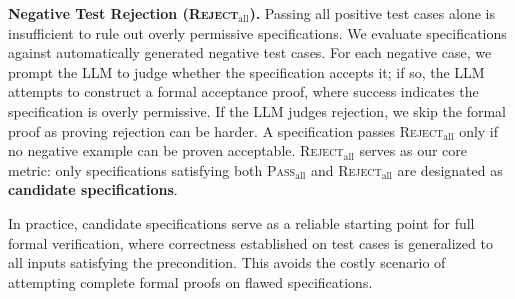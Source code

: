 
\textbf{Negative Test Rejection (\textsc{Reject}$_{\text{all}}$).}
Passing all positive test cases alone is insufficient to rule out overly permissive specifications. 
We evaluate specifications against automatically generated negative test cases. 
For each negative case, we prompt the LLM to judge whether the specification accepts it; if so, the LLM attempts to construct a formal acceptance proof, where success indicates the specification is overly permissive.
If the LLM judges rejection, we skip the formal proof as proving rejection can be harder.
A specification passes \textsc{Reject}$_{\text{all}}$ only if no negative example can be proven acceptable.
\textsc{Reject}$_{\text{all}}$ serves as our core metric: only specifications satisfying both \textsc{Pass}$_{\text{all}}$ and \textsc{Reject}$_{\text{all}}$ are designated as \textbf{candidate specifications}.

In practice, candidate specifications serve as a reliable starting point for full formal verification, where correctness established on test cases is generalized to all inputs satisfying the precondition. This avoids the costly scenario of attempting complete formal proofs on flawed specifications.



